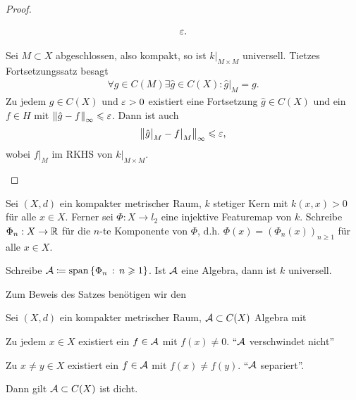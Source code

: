 \begin{proof}
\begin{proofenum}
\begin{align*}
\ep.
\end{align*}
\item Sei $M\subset X$ abgeschlossen, also kompakt, so ist
$k\big|_{M\times M}$ universell. Tietzes Fortsetzungssatz besagt
\begin{align*}
\forall g\in C(M) \exists \hat{g}\in C(X) : \hat{g}\big|_M = g.
\end{align*}
Zu jedem $g\in C(X)$ und $\ep >0$ existiert eine Fortsetzung $\hat{g}\in C(X)$
und ein $f\in H$ mit $\norm{\hat{g}-f}_\infty \le\ep$. Dann ist auch
\begin{align*}
\norm{\hat{g}\big|_M - f\big|_M}_\infty \le \ep,
\end{align*}
wobei $f\big|_M$ im RKHS von $k\big|_{M\times M}$.\qedhere
\end{proofenum} 
\end{proof}

\begin{prop}
\label{prop:5.4.3}
Sei $(X,d)$ ein kompakter metrischer Raum, $k$ stetiger Kern mit $k(x,x) >
0$ für alle $x\in X$. Ferner sei $\Phi: X\to l_2$ eine injektive Featuremap von
$k$. Schreibe $\Phi_n : X\to \R$ für die $n$-te Komponente von $\Phi$, d.h.
$\Phi(x) = (\Phi_n(x))_{n\ge 1}$ für alle $x\in X$.

Schreibe $\AA\defl\mathrm{span}\setdef{\Phi_n}{n\ge 1}$. Ist $\AA$ eine Algebra,
dann ist $k$ universell.~\fishhere
\end{prop}

Zum Beweis des Satzes benötigen wir den
\begin{prop*}
Sei $(X,d)$ ein kompakter metrischer Raum, $\AA\subset C(X)$ Algebra mit
\begin{propenum}
\item Zu jedem $x\in X$ existiert ein $f\in \AA$ mit $f(x)\neq 0$. "`$\AA$
verschwindet nicht"'
\item Zu $x\neq y\in X$ existiert ein $f\in \AA$ mit $f(x)\neq f(y)$. "`$\AA$
separiert"'.
\end{propenum}
Dann gilt $\AA\subset C(X)$ ist dicht.\fishhere
\end{prop*}

